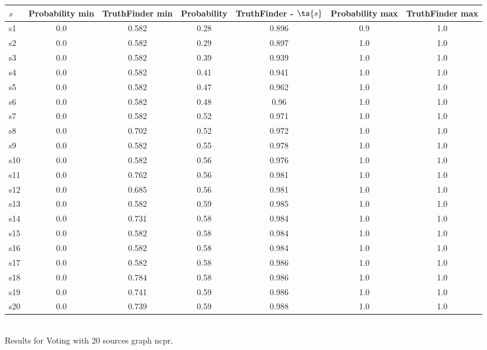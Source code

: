 \documentclass{article}
\begin{document}
\noindent\begin{tabular}{|l|c|c|c|c|c|c|}
\hline
$s$& Probability min & TruthFinder min & Probability & TruthFinder - $\ts{s}$ & Probability max & TruthFinder max\\
\hline
s1 &0.0 & 0.582 & 0.28 & 0.896 & 0.9 & 1.0\\
\hline
s2 &0.0 & 0.582 & 0.29 & 0.897 & 1.0 & 1.0\\
\hline
s3 &0.0 & 0.582 & 0.39 & 0.939 & 1.0 & 1.0\\
\hline
s4 &0.0 & 0.582 & 0.41 & 0.941 & 1.0 & 1.0\\
\hline
s5 &0.0 & 0.582 & 0.47 & 0.962 & 1.0 & 1.0\\
\hline
s6 &0.0 & 0.582 & 0.48 & 0.96 & 1.0 & 1.0\\
\hline
s7 &0.0 & 0.582 & 0.52 & 0.971 & 1.0 & 1.0\\
\hline
s8 &0.0 & 0.702 & 0.52 & 0.972 & 1.0 & 1.0\\
\hline
s9 &0.0 & 0.582 & 0.55 & 0.978 & 1.0 & 1.0\\
\hline
s10 &0.0 & 0.582 & 0.56 & 0.976 & 1.0 & 1.0\\
\hline
s11 &0.0 & 0.762 & 0.56 & 0.981 & 1.0 & 1.0\\
\hline
s12 &0.0 & 0.685 & 0.56 & 0.981 & 1.0 & 1.0\\
\hline
s13 &0.0 & 0.582 & 0.59 & 0.985 & 1.0 & 1.0\\
\hline
s14 &0.0 & 0.731 & 0.58 & 0.984 & 1.0 & 1.0\\
\hline
s15 &0.0 & 0.582 & 0.58 & 0.984 & 1.0 & 1.0\\
\hline
s16 &0.0 & 0.582 & 0.58 & 0.984 & 1.0 & 1.0\\
\hline
s17 &0.0 & 0.582 & 0.58 & 0.986 & 1.0 & 1.0\\
\hline
s18 &0.0 & 0.784 & 0.58 & 0.986 & 1.0 & 1.0\\
\hline
s19 &0.0 & 0.741 & 0.59 & 0.986 & 1.0 & 1.0\\
\hline
s20 &0.0 & 0.739 & 0.59 & 0.988 & 1.0 & 1.0\\
\hline
\end{tabular}\\

\noindent Results for Voting with 20 sources graph ncpr.
\end{document}
